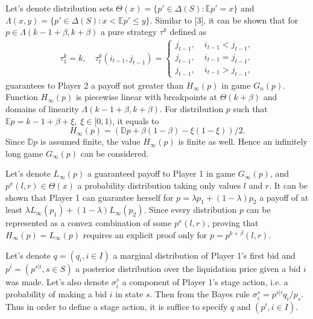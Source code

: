 Let's denote distribution sets $\Theta(x) = \{p' \in \Delta(S): \mathbb{E}p' =
x\}$ and $\Lambda(x, y) = \{p' \in \Delta(S): x < \mathbb{E}p' \leq y \}$.
Similar to [3], it can be shown that for $p \in \Lambda(k-1+\beta, k+\beta)$ a
pure strategy $\tau^k$ defined as
\begin{gather*}
  \tau_1^k = k, \quad \tau_t^k(i_{t-1}, j_{t-1}) =
  \begin{cases}
    j_{t-1}, &\; i_{t-1} < j_{t-1},\\
    j_{t-1}, &\; i_{t-1} = j_{t-1},\\
    j_{t-1}, &\; i_{t-1} > j_{t-1},
  \end{cases}
\end{gather*}
guarantees to Player 2 a payoff not greater than $H_\infty(p)$ in game $G_n(p)$.
Function $H_\infty(p)$ is piecewise linear with breakpoints at $\Theta(k+\beta)$
and domains of linearity $\Lambda(k-1+\beta, k+\beta)$. For distribution $p$
such that $\mathbb{E} p = k - 1 + \beta + \xi, \; \xi \in [0, 1)$, it equals to
\begin{equation*}
  H_\infty(p) = (\mathbb{D} p + \beta(1-\beta) -\xi(1-\xi))/2.
\end{equation*}
Since $\mathbb{D}p$ is assumed finite, the value $H_\infty(p)$ is finite as
well. Hence an infinitely long game $G_\infty(p)$ can be considered.

Let's denote $L_\infty(p)$ a guaranteed payoff to Player 1 in game
$G_\infty(p)$, and $p^x(l, r) \in \Theta(x)$ a probability distribution taking
only values $l$ and $r$. It can be shown that Player 1 can guarantee herself for
$p = \lambda p_1 + (1-\lambda) p_2$ a payoff of at least $\lambda L_\infty(p_1)
+ (1-\lambda) L_\infty(p_2)$. Since every distribution $p$ can be represented as
a convex combination of some $p^x(l,r)$, proving that $H_\infty(p) =
L_\infty(p)$ requires an explicit proof only for $p = p^{k+\beta}(l, r)$.

Let's denote $q = (q_i, i \in I)$ a marginal distribution of Player 1's first
bid and $p^i = (p^{s|i}, s \in S)$ a posterior distribution over the liquidation
price given a bid $i$ was made. Let's also denote $\sigma^s_i$ a component of
Player 1's stage action, i.e. a probability of making a bid $i$ in state $s$.
Then from the Bayes rule $\sigma^s_i = p^{s|i} q_i / p_s$. Thus in order to
define a stage action, it is suffice to specify $q$ and $(p^i, i \in I)$.

